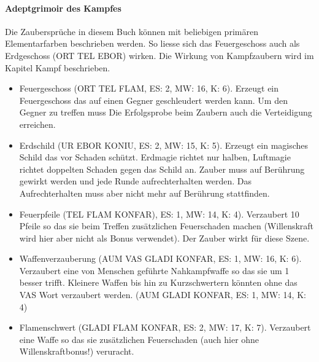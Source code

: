 \documentclass{article}
\begin{document}
\paragraph{Adeptgrimoir des Kampfes}

Die Zaubersprüche in diesem Buch können mit beliebigen primären Elementarfarben beschrieben werden. So liesse sich
das Feuergeschoss auch als Erdgeschoss (ORT TEL EBOR) wirken. Die Wirkung von Kampfzaubern wird im Kapitel Kampf
beschrieben.

\begin{itemize}
\item Feuergeschoss (ORT TEL FLAM, ES: 2, MW: 16, K: 6). Erzeugt ein Feuergeschoss das auf einen Gegner geschleudert werden kann. Um den Gegner zu treffen muss Die Erfolgsprobe beim Zaubern auch die Verteidigung erreichen.
\end{itemize}

\begin{itemize}
\item Erdschild (UR EBOR KONIU, ES: 2, MW: 15, K: 5). Erzeugt ein magisches Schild das vor Schaden schützt. Erdmagie richtet nur halben, Luftmagie richtet doppelten Schaden gegen das Schild an. Zauber muss auf Berührung gewirkt werden und jede Runde aufrechterhalten werden. Das Aufrechterhalten muss aber nicht mehr auf Berührung stattfinden.
\end{itemize}

\begin{itemize}
\item Feuerpfeile (TEL FLAM KONFAR), ES: 1, MW: 14, K: 4). Verzaubert 10 Pfeile so das sie beim Treffen zusätzlichen Feuerschaden machen (Willenskraft wird hier aber nicht als Bonus verwendet). Der Zauber wirkt für diese Szene.
\end{itemize}

\begin{itemize}
\item Waffenverzauberung (AUM VAS GLADI KONFAR, ES: 1, MW: 16, K: 6). Verzaubert eine von Menschen geführte Nahkampfwaffe so das sie um 1 besser trifft. Kleinere Waffen bis hin zu Kurzschwertern könnten ohne das VAS Wort verzaubert werden. (AUM GLADI KONFAR, ES: 1, MW: 14, K: 4)
\end{itemize}

\begin{itemize}
\item Flamenschwert (GLADI FLAM KONFAR, ES: 2, MW: 17, K: 7). Verzaubert eine Waffe so das sie zusätzlichen Feuerschaden (auch hier ohne Willenskraftbonus!) veruracht.
\end{itemize}
\end{document}
